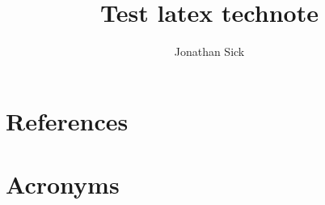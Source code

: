 \documentclass[DM,authoryear,toc]{lsstdoc}
\title{Test latex technote}
\author{%
Jonathan Sick
}
\date{\vcsDate}
\begin{document}
\mkshorttitle


\appendix
\section{References} \label{sec:bib}


\section{Acronyms} \label{sec:acronyms}

\end{document}
